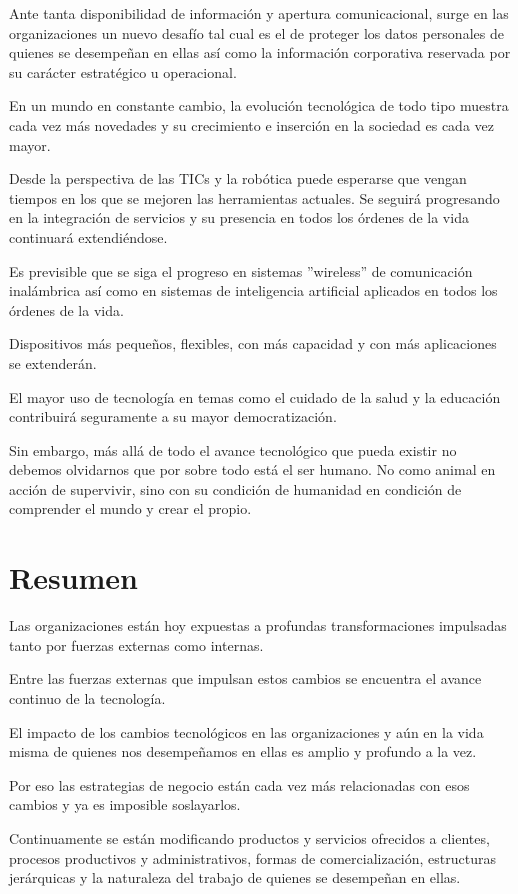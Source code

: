 \documentclass[a4paper, 12pt]{article}
\begin{document}
Ante tanta disponibilidad de información y apertura comunicacional, surge en las organizaciones un nuevo desafío tal cual es el de proteger los datos personales de quienes se desempeñan en ellas así como la información corporativa reservada por su carácter estratégico u operacional.

En un mundo en constante cambio, la evolución tecnológica de todo tipo muestra cada vez más novedades y su crecimiento e inserción en la sociedad es cada vez mayor.

Desde la perspectiva de las TICs y la robótica puede esperarse que vengan tiempos en los que se mejoren las herramientas actuales. Se seguirá progresando en la integración de servicios y su presencia en todos los órdenes de la vida continuará extendiéndose.

Es previsible que se siga el progreso en sistemas ''wireless''  de comunicación inalámbrica así como en sistemas de inteligencia artificial aplicados en todos los órdenes de la vida.

Dispositivos más pequeños, flexibles, con más capacidad y con más aplicaciones se extenderán.

El mayor uso de tecnología en temas como el cuidado de la salud y la educación contribuirá seguramente a su mayor democratización.

Sin embargo, más allá de todo el avance tecnológico que pueda existir no debemos olvidarnos que por sobre todo está el ser humano. No como animal en acción de supervivir, sino con su condición de humanidad en condición de comprender el mundo y crear el propio.

\section{Resumen}

Las organizaciones están hoy expuestas a profundas transformaciones impulsadas tanto por fuerzas externas como internas.

Entre las fuerzas externas que impulsan estos cambios se encuentra el avance continuo de la tecnología.

El impacto de los cambios tecnológicos en las organizaciones y aún en la vida misma de quienes nos desempeñamos en ellas es amplio y profundo a la vez.

Por eso las estrategias de negocio están cada vez más relacionadas con esos cambios y ya es imposible soslayarlos.

Continuamente se están modificando productos y servicios ofrecidos a clientes, procesos productivos y administrativos, formas de comercialización, estructuras jerárquicas y la naturaleza del trabajo de quienes se desempeñan en ellas.
\end{document}
